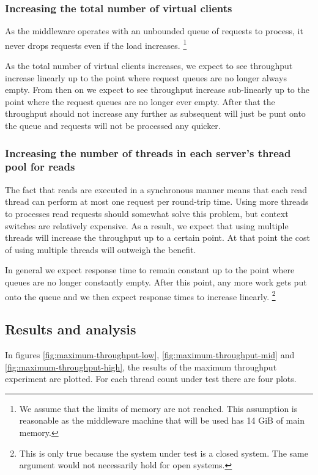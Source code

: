 \documentclass[11pt]{article}
\begin{document}
\subsubsection{Increasing the total number of virtual clients}

As the middleware operates with an unbounded queue of requests to process, it never drops requests even if the load increases.
\footnote{
  We assume that the limits of memory are not reached.
  This assumption is reasonable as the middleware machine that will be used has 14 GiB of main memory.
}

As the total number of virtual clients increases, we expect to see throughput increase linearly up to the point where request queues are no longer always empty.
From then on we expect to see throughput increase sub-linearly up to the point where the request queues are no longer ever empty.
After that the throughput should not increase any further as subsequent will just be punt onto the queue and requests will not be processed any quicker.

\subsubsection{Increasing the number of threads in each server's thread pool for reads}

The fact that reads are executed in a synchronous manner means that each read thread can perform at most one request per round-trip time.
Using more threads to processes read requests should somewhat solve this problem, but context switches are relatively expensive.
As a result, we expect that using multiple threads will increase the throughput up to a certain point.
At that point the cost of using multiple threads will outweigh the benefit.

In general we expect response time to remain constant up to the point where queues are no longer constantly empty.
After this point, any more work gets put onto the queue and we then expect response times to increase linearly.
\footnote{
  This is only true because the system under test is a closed system.
  The same argument would not necessarily hold for open systems.
}

\subsection{Results and analysis}

In figures \ref{fig:maximum-throughput-low}, \ref{fig:maximum-throughput-mid} and \ref{fig:maximum-throughput-high}, the results of the maximum throughput experiment are plotted.
For each thread count under test there are four plots.
\end{document}
